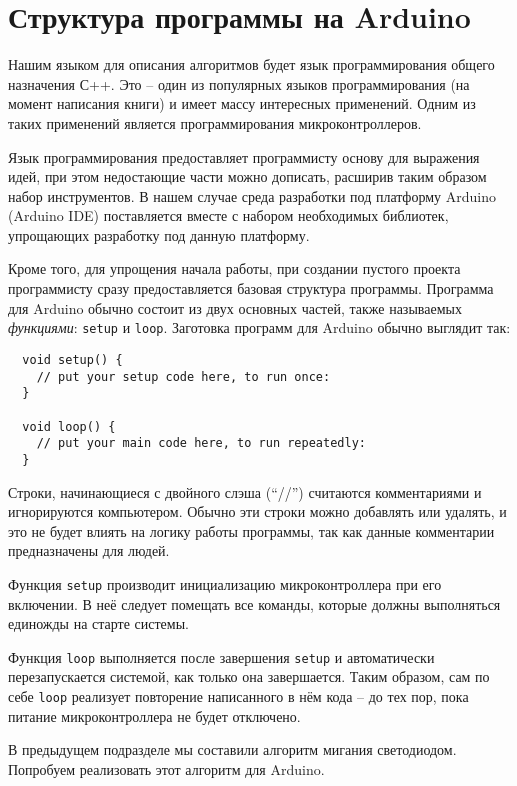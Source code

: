 \documentclass[../sparc.tex]{subfiles}
\begin{document}
\section{Структура программы на Arduino}

Нашим языком для описания алгоритмов будет язык программирования общего
назначения С++.  Это -- один из популярных языков программирования (на момент
написания книги) и имеет массу интересных применений.  Одним из таких применений
является программирования микроконтроллеров.

Язык программирования предоставляет программисту основу для выражения идей, при
этом недостающие части можно дописать, расширив таким образом набор
инструментов.  В нашем случае среда разработки под платформу Arduino (Arduino
IDE) поставляется вместе с набором необходимых библиотек, упрощающих разработку
под данную платформу.

Кроме того, для упрощения начала работы, при создании пустого проекта
программисту сразу предоставляется базовая структура программы.  Программа для
Arduino обычно состоит из двух основных частей, также называемых
\emph{функциями}: \texttt{setup} и \texttt{loop}.  Заготовка программ для
Arduino обычно выглядит так:

\begin{verbatim}
  void setup() {
    // put your setup code here, to run once:
  }

  void loop() {
    // put your main code here, to run repeatedly:
  }
\end{verbatim}

Строки, начинающиеся с двойного слэша (``//'') считаются комментариями и
игнорируются компьютером.  Обычно эти строки можно добавлять или удалять, и это
не будет влиять на логику работы программы, так как данные комментарии
предназначены для людей.

Функция \texttt{setup} производит инициализацию микроконтроллера при его
включении.  В неё следует помещать все команды, которые должны выполняться
единожды на старте системы.

Функция \texttt{loop} выполняется после завершения \texttt{setup} и
автоматически перезапускается системой, как только она завершается.  Таким
образом, сам по себе \texttt{loop} реализует повторение написанного в нём кода --
до тех пор, пока питание микроконтроллера не будет отключено.

В предыдущем подразделе мы составили алгоритм мигания светодиодом.  Попробуем
реализовать этот алгоритм для Arduino.
\end{document}
